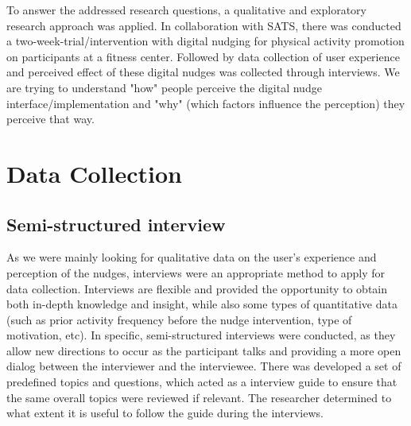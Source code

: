 To answer the addressed research questions, a qualitative and exploratory research approach was applied. In collaboration with SATS, there was conducted a two-week-trial/intervention with digital nudging for physical activity promotion on participants at a fitness center. Followed by data collection of user experience and perceived effect of these digital nudges was collected through interviews. 
We are trying to understand "how" people perceive the digital nudge interface/implementation and "why" (which factors influence the perception) they perceive that way.  


\section{Data Collection}
    \subsection{Semi-structured interview}
   As we were mainly looking for qualitative data on the user's experience and perception of the nudges, interviews were an appropriate method to apply for data collection. Interviews are flexible and provided the opportunity to obtain both in-depth knowledge and insight, while also some types of quantitative data (such as prior activity frequency before the nudge intervention, type of motivation, etc). In specific, semi-structured interviews were conducted, as they allow new directions to occur as the participant talks and providing a more open dialog between the interviewer and the interviewee. There was developed a set of predefined topics and questions, which acted as a interview guide to ensure that the same overall topics were reviewed if relevant. The researcher determined to what extent it is useful to follow the guide during the interviews.
    
